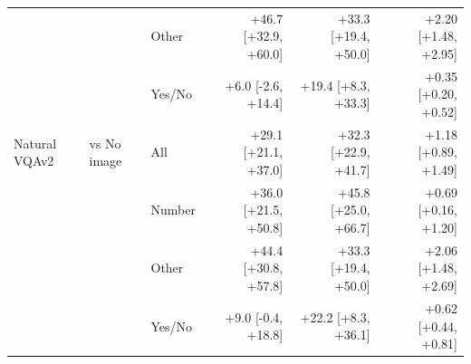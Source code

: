 \begin{table}[t]
\begin{tabular}{lllrrr}
 &  & Other & +46.7 [+32.9, +60.0] & +33.3 [+19.4, +50.0] & +2.20 [+1.48, +2.95] \\
 &  & Yes/No & +6.0 [-2.6, +14.4] & +19.4 [+8.3, +33.3] & +0.35 [+0.20, +0.52] \\
Natural VQAv2 & vs No image & All & +29.1 [+21.1, +37.0] & +32.3 [+22.9, +41.7] & +1.18 [+0.89, +1.49] \\
 &  & Number & +36.0 [+21.5, +50.8] & +45.8 [+25.0, +66.7] & +0.69 [+0.16, +1.20] \\
 &  & Other & +44.4 [+30.8, +57.8] & +33.3 [+19.4, +50.0] & +2.06 [+1.48, +2.69] \\
 &  & Yes/No & +9.0 [-0.4, +18.8] & +22.2 [+8.3, +36.1] & +0.62 [+0.44, +0.81] \\
\bottomrule
\end{tabular}
\end{table}
